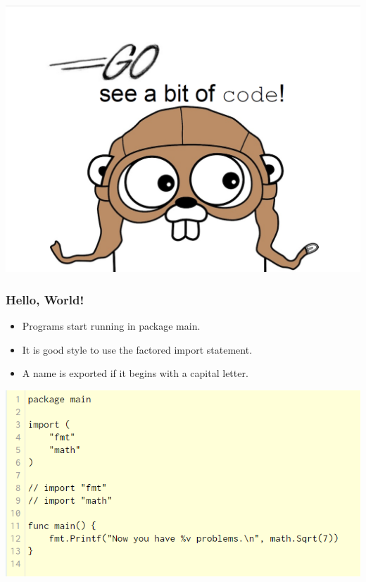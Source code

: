 \documentclass[14pt]{beamer}
\begin{document}
{
\begin{frame}
    \includegraphics[width=\linewidth]{img/golang.PNG}
\end{frame}
}

{
\begin{frame}
    \frametitle{Hello, World!}
    \begin{itemize}
        \item Programs start running in package main.
        \item It is good style to use the factored import statement.
        \item A name is exported if it begins with a capital letter.
    \end{itemize}
    \begin{center}
        \includegraphics[width=0.7\linewidth]{img/introtogo.PNG}
    \end{center}
\end{frame}
}
\end{document}
